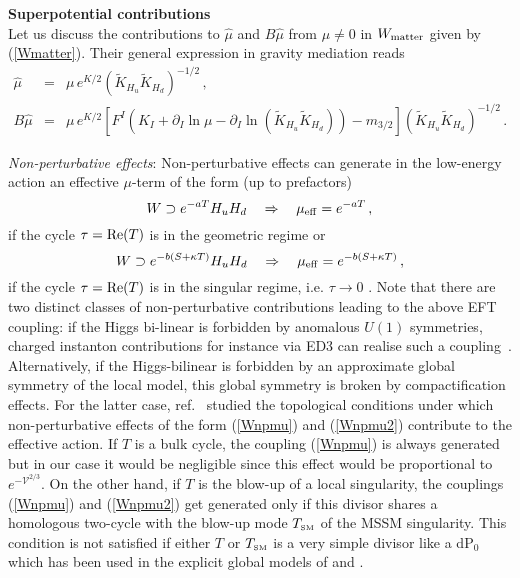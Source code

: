 \documentclass[11pt,a4paper]{article}
\newcommand{\be}{\begin{equation}}
\newcommand{\ee}{\end{equation}}
\def\SM{{\scriptscriptstyle \rm SM}}
\newcommand\vo{{\mathcal{V}}}
\begin{document}
\newpage
\noindent \textbf{Superpotential contributions}\medskip\\
Let us discuss the contributions to $\hat\mu$ and $B\hat\mu$ from $\mu\neq 0$ in $W_{\rm matter}$ given by (\ref{Wmatter}).
Their general expression in gravity mediation reads \cite{Brignole:1993dj}
\begin{eqnarray}
\label{muW}
\hat{\mu} &=& \mu\,e^{K/2} \left(\tilde{K}_{H_u} \tilde{K}_{H_d}\right)^{-1/2}\,, \\
\label{BmuW}
B\hat{\mu} &=& \mu\,e^{K/2} \left[F^I \left(K_I + \partial_I \ln\mu - \partial_I \ln\left(\tilde{K}_{H_u} \tilde{K}_{H_d}\right)\right) - m_{3/2}\right]\left(\tilde{K}_{H_u} \tilde{K}_{H_d}\right)^{-1/2}\,.
\end{eqnarray}

\medskip
\emph{Non-perturbative effects}: Non-perturbative effects can generate in the low-energy action an effective $\mu$-term of the form (up to prefactors)
\be
W\supset e^{-a T} H_u H_d\quad\Rightarrow\quad \mu_{\rm eff} = e^{-a T}\,,
\label{Wnpmu}
\ee
if the cycle $\tau={\rm Re}(T)$ is in the geometric regime \cite{Ibanez:2007tu} or
\be
W\supset e^{-b \left(S+\kappa T\right)} H_u H_d\quad\Rightarrow\quad \mu_{\rm eff} = e^{-b\left(S+\kappa T\right)}\,,
\label{Wnpmu2}
\ee
if the cycle $\tau={\rm Re}(T)$ is in the singular regime, i.e. $\tau\to 0$ \cite{Berenstein:2005xa}. Note that there are two distinct classes of non-perturbative contributions leading to the above EFT coupling: if the Higgs bi-linear is forbidden by anomalous $U(1)$ symmetries, charged instanton contributions for instance via ED3 can realise such a coupling~\cite{Ibanez:2007tu,Berenstein:2005xa}. Alternatively, if the Higgs-bilinear is forbidden by an approximate global symmetry of the local model, this global symmetry is broken by compactification effects. For the latter case, ref.~\cite{Berg:2012aq} studied the topological conditions under which non-perturbative effects of the form (\ref{Wnpmu}) and (\ref{Wnpmu2})
contribute to the effective action. If $T$ is a bulk cycle, the coupling (\ref{Wnpmu}) is always generated but in our case it would be negligible since this effect would be proportional to $e^{-\vo^{2/3}}$. On the other hand, if $T$ is the blow-up of a local singularity, the couplings (\ref{Wnpmu}) and (\ref{Wnpmu2})
get generated only if this divisor shares a homologous two-cycle with the blow-up mode $T_\SM$ of the MSSM singularity.
This condition is not satisfied if either $T$ or $T_\SM$ is a very simple divisor like a dP$_0$ which has been used in the explicit global models of \cite{Cicoli:2012vw} and \cite{Cicoli:2013cha}.
\end{document}
